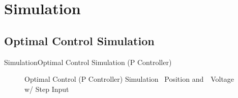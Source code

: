 \documentclass{beamer}
\begin{document}

\section{Simulation}

\subsection{Optimal Control Simulation}

\begin{frame}{Simulation}{Optimal Control Simulation (P Controller)}
    \begin{figure}
      \centering
      \caption{Optimal Control (P Controller) Simulation ~Position and~~Voltage w/ Step Input}
      \label{fig:LQR_Sim_Con}
    \end{figure}
\end{frame}
\end{document}
